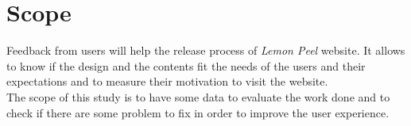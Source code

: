 \documentclass[../../UsabilityReport.tex]{subfiles}
\begin{document}
\section{Scope}
	Feedback from users will help the release process of \textit{Lemon Peel} website. It allows to know if the design and the contents fit the needs of the users and their expectations and to measure their motivation to visit the website.\\
	The scope of this study is to have some data to evaluate the work done and to check if there are some problem to fix in order to improve the user experience.
\end{document}
